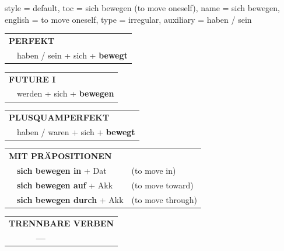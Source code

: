 \begin{verbentry}{
  style = {default},
  toc = {sich bewegen (to move oneself)},
  name = {sich bewegen},
  english = {to move oneself},
  type = {irregular},
  auxiliary = {haben / sein}
}
 \begin{tabular}{rl}
     \multicolumn{2}{l}{\textbf{PERFEKT}}\\
   & haben / sein + sich + \textbf{bewegt}
  \end{tabular}
\hfill
   \begin{tabular}{rl}
    \multicolumn{2}{l}{\textbf{FUTURE I}}\\
   & werden + sich + \textbf{bewegen}\\
  \end{tabular}
\hfill
   \begin{tabular}{rl}
      \multicolumn{2}{l}{\textbf{PLUSQUAMPERFEKT}}\\
   & haben / waren + sich + \textbf{bewegt}\\
  \end{tabular}

   \vspace{10pt}

   \begin{tabular}{lll}
      \multicolumn{3}{l}{\textbf{MIT PRÄPOSITIONEN}}\\
& \textbf{sich bewegen in} + Dat & (to move in)\\
& \textbf{sich bewegen auf} + Akk & (to move toward)\\
& \textbf{sich bewegen durch} + Akk & (to move through)\\
\end{tabular}
  \hfill
\begin{tabular}{lll}
\multicolumn{3}{l}{\textbf{TRENNBARE VERBEN}}\\
& \textbf{---} & \\
\end{tabular}

  \vspace{-5pt}
\end{verbentry}

